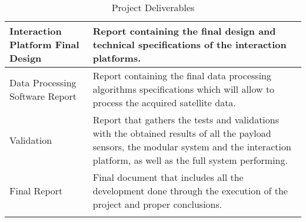 \begin{longtable}[H]{>{\raggedright\arraybackslash}p{4cm} p{10cm}}
	Interaction Platform Final Design  & Report containing the final design and technical specifications of the interaction platforms.\vspace{0.2cm} \\
	
	\midrule

	Data Processing Software Report  & Report containing the final data processing algorithms specifications which will allow to process the acquired satellite data.\vspace{0.2cm} \\
	
	\midrule

	Validation & Report that gathers the tests and validations with the obtained results of all the payload sensors, the modular system and the interaction platform, as well as the full system performing.\vspace{0.2cm} \\
	
	\midrule
		
	Final Report & Final document that includes all the development done through the execution of the project and proper conclusions.\vspace{0.2cm} \\ 
	
	\bottomrule[2pt]
	
	\caption{Project Deliverables}
	\label{PDel}
\end{longtable}

